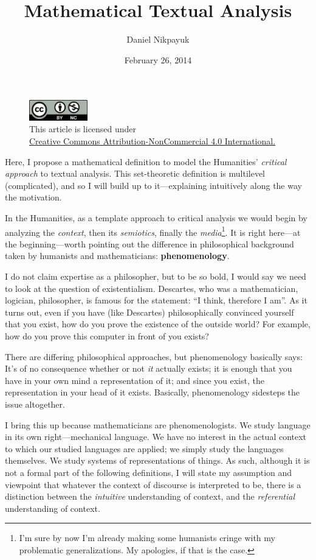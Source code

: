 \documentclass[twoside]{article}
\title{Mathematical Textual Analysis}
\author{Daniel Nikpayuk}
\date{February 26, 2014}
\begin{document}
\maketitle

\begin{figure}[h]
\centering
\includegraphics[width=1in]{../../../cc-by-nc.png}\\[0.1in]
\tiny This article is licensed under \\
\href{http://creativecommons.org/licenses/by-nc/4.0/}
{Creative Commons Attribution-NonCommercial 4.0 International.}\\[0.3in]
\end{figure}

Here, I propose a mathematical definition to model the Humanities' \emph{critical approach} to textual analysis.
This set-theoretic definition is multilevel (complicated), and so I will build up to it---explaining intuitively
along the way the motivation.

In the Humanities, as a template approach to critical analysis we would begin by analyzing the \emph{context},
then its \emph{semiotics}, finally the \emph{media}\footnote{I'm sure by now I'm already making some humanists
cringe with my problematic generalizations. My apologies, if that is the case.}. It is right here---at the beginning---worth
pointing out the difference in philosophical background taken by humanists and mathematicians: {\bfseries phenomenology}.

I do not claim expertise as a philosopher, but to be so bold, I would say we need to look at the question of existentialism.
Descartes, who was a mathematician, logician, philosopher, is famous for the statement: ``I think, therefore I am''. As it
turns out, even if you have (like Descartes) philosophically convinced yourself that you exist, how do you prove the existence
of the outside world? For example, how do you prove this computer in front of you exists?

There are differing philosophical approaches, but phenomenology basically says: It's of no consequence whether or not
\emph{it} actually exists; it is enough that you have in your own mind a representation of it; and since you exist,
the representation in your head of it exists. Basically, phenomenology sidesteps the issue altogether.

I bring this up because mathematicians are phenomenologists. We study language in its own right---mechanical language.
We have no interest in the actual context to which our studied languages are applied; we simply study the languages themselves.
We study systems of representations of things.  As such, although it is not a formal part of the following definitions,
I will state my assumption and viewpoint that whatever the context of discourse is interpreted to be, there is a distinction
between the \emph{intuitive} understanding of context, and the \emph{referential} understanding of context.
\end{document}
